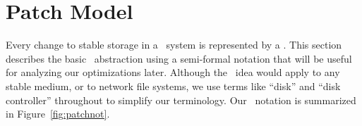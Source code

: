 
\section{Patch Model}
\label{sec:patch}

\makeatletter
\let\emptyset\varnothing
\newcommand{\PState}[1]{\ensuremath{#1.\textit{state}}}
\newcommand{\PBlock}[1]{\ensuremath{#1.\textit{block}}}
\newcommand{\PMemst}{\ensuremath{\textit{mem}}}
\newcommand{\PInfst}{\ensuremath{\textit{flight}}}
\newcommand{\PDiskst}{\ensuremath{\textit{disk}}}
\newcommand{\PSetlim}[1]{\def\@next{#1}\ifx\@next\@empty\else[\@next]\fi}
\newcommand{\PMem}[1][]{\ensuremath{\textit{Mem}\PSetlim{#1}}}
\newcommand{\PInf}[1][]{\ensuremath{\textit{Flight}\PSetlim{#1}}}
\newcommand{\PDisk}[1][]{\ensuremath{\textit{Disk}\PSetlim{#1}}}
\newcommand{\PHard}[1][]{\ensuremath{\textit{\Nrb}\PSetlim{#1}}}
\newcommand{\PSoft}[1][]{\ensuremath{\textit{\Rb}\PSetlim{#1}}}
\newcommand{\PEmpty}[1][]{\ensuremath{\textit{\Noop}\PSetlim{#1}}}
\newcommand{\PDDepset}[1]{\ensuremath{\def\@next{#1}\ifx\@next\@empty\else\@next.\fi\textit{ddeps}}}
\newcommand{\PDepend}{\ensuremath{\leadsto}}
\newcommand{\PDDepend}{\ensuremath{\rightarrow}}
\newcommand{\PDepset}[1]{\ensuremath{\textit{Dep}[#1]}}
\newcommand{\PRDepset}[1]{\ensuremath{\textit{RDep}[#1]}}
\makeatother

Every change to stable storage in a \Kudos\ system is represented by a
\emph{\patch}.
%
This section describes the basic \patch\ abstraction using a semi-formal
notation that will be useful for analyzing our optimizations later.
%
Although the \patch\ idea would apply to any stable medium, or to network
file systems, we use terms like ``disk'' and ``disk controller'' throughout
to simplify our terminology.
%
Our \patch\ notation is summarized in Figure~\ref{fig:patchnot}.

